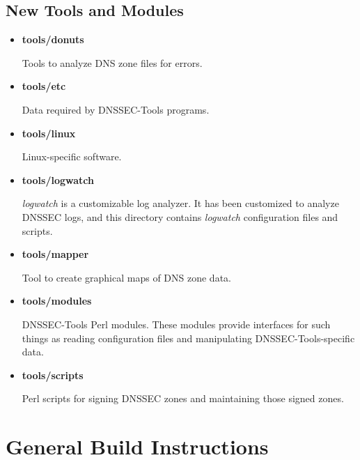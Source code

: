 \documentclass[12pt]{article}
\newcommand{\cmd}[1]{{\em #1}}
\newcommand{\path}[1]{{\bf #1}}
\begin{document}

\subsection{New Tools and Modules}

\begin{itemize}
\item{\path{tools/donuts}}

Tools to analyze DNS zone files for errors.

\item{\path{tools/etc}}

Data required by DNSSEC-Tools programs.

\item{\path{tools/linux}}

Linux-specific software.

\item{\path{tools/logwatch}}

\cmd{logwatch} is a customizable log analyzer.  It has been customized to
analyze DNSSEC logs, and this directory contains \cmd{logwatch} configuration
files and scripts.

\item{\path{tools/mapper}}

Tool to create graphical maps of DNS zone data.

\item{\path{tools/modules}}

DNSSEC-Tools Perl modules.  These modules provide interfaces for such
things as reading configuration files and manipulating DNSSEC-Tools-specific
data.

\item{\path{tools/scripts}}

Perl scripts for signing DNSSEC zones and maintaining those signed zones.

\end{itemize}


\clearpage

\section{General Build Instructions}
\label{buildinstructions}
\end{document}

